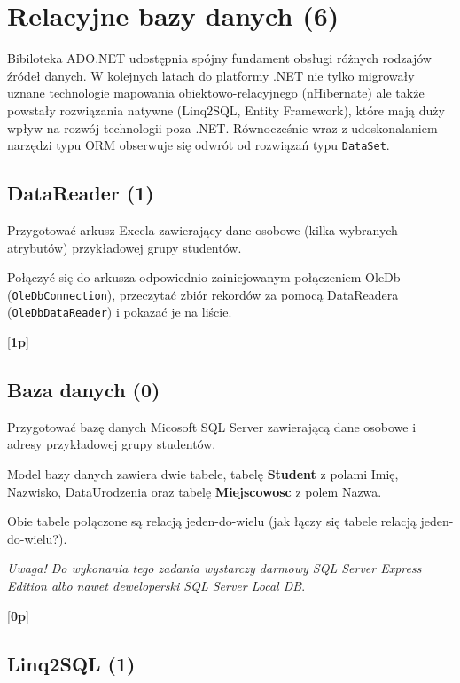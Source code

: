 ﻿\section{Relacyjne bazy danych (6)}

    Bibiloteka ADO.NET udostępnia spójny fundament obsługi różnych rodzajów źródeł danych. W kolejnych latach
	  do platformy .NET nie tylko migrowały uznane technologie mapowania obiektowo-relacyjnego (nHibernate)
	  ale także powstały rozwiązania natywne (Linq2SQL, Entity Framework), które mają duży wpływ na rozwój technologii poza
	  .NET. Równocześnie wraz z udoskonalaniem narzędzi typu ORM obserwuje się odwrót od rozwiązań typu {\tt DataSet}.

\subsection{DataReader (1)}
\label{ereader}

      Przygotować arkusz Excela zawierający dane osobowe (kilka wybranych atrybutów) przykładowej grupy studentów.
\label{ado_excel}	  
      
      Połączyć się do arkusza odpowiednio zainicjowanym połączeniem OleDb ({\tt OleDbConnection}), 
      przeczytać zbiór rekordów za pomocą DataReadera ({\tt OleDbDataReader}) i pokazać je na liście.
            
      [{\bf 1p}]

\subsection{Baza danych (0)}
\label{baza}

\label{ado_dbms}	  

      Przygotować bazę danych Micosoft SQL Server zawierającą dane osobowe i adresy przykładowej grupy studentów.

      Model bazy danych zawiera dwie tabele, tabelę {\bf Student} z polami Imię, Nazwisko, DataUrodzenia oraz
      tabelę {\bf Miejscowosc} z polem Nazwa.
      
      Obie tabele połączone są relacją jeden-do-wielu (jak łączy się tabele relacją jeden-do-wielu?).
	  
	  {\em Uwaga! Do wykonania tego zadania wystarczy darmowy SQL Server Express Edition albo nawet deweloperski
	  SQL Server Local DB}.
      
      [{\bf 0p}] 
      
\subsection{Linq2SQL (1)}

